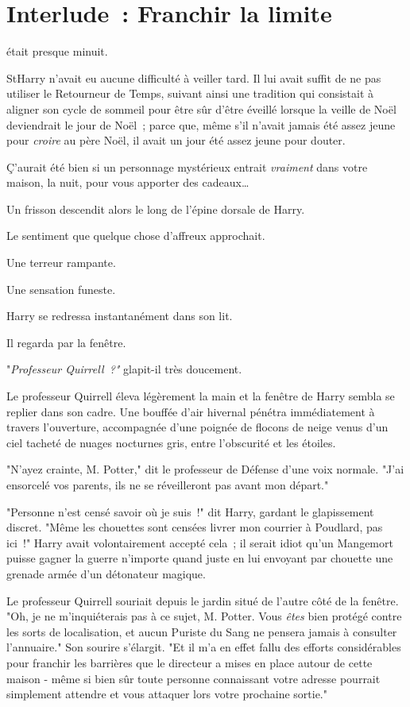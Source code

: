 \chapter{Interlude~: Franchir la limite}

 était presque minuit.

\hplettrineextrapara
StHarry n'avait eu aucune difficulté à veiller tard. Il lui avait suffit de ne pas utiliser le Retourneur de Temps, suivant ainsi une tradition qui consistait à aligner son cycle de sommeil pour être sûr d'être éveillé lorsque la veille de Noël deviendrait le jour de Noël~; parce que, même s'il n'avait jamais été assez jeune pour \emph{croire} au père Noël, il avait un jour été assez jeune pour douter.

Ç'aurait été bien si un personnage mystérieux entrait \emph{vraiment} dans votre maison, la nuit, pour vous apporter des cadeaux…

Un frisson descendit alors le long de l'épine dorsale de Harry.

Le sentiment que quelque chose d'affreux approchait.

Une terreur rampante.

Une sensation funeste.

Harry se redressa instantanément dans son lit.

Il regarda par la fenêtre.

"\emph{Professeur Quirrell~?"} glapit-il très doucement.

Le professeur Quirrell éleva légèrement la main et la fenêtre de Harry sembla se replier dans son cadre. Une bouffée d'air hivernal pénétra immédiatement à travers l'ouverture, accompagnée d'une poignée de flocons de neige venus d'un ciel tacheté de nuages nocturnes gris, entre l'obscurité et les étoiles.

"N'ayez crainte, M. Potter," dit le professeur de Défense d'une voix normale. "J'ai ensorcelé vos parents, ils ne se réveilleront pas avant mon départ."

"Personne n'est censé savoir où je suis~!" dit Harry, gardant le glapissement discret. "Même les chouettes sont censées livrer mon courrier à Poudlard, pas ici~!" Harry avait volontairement accepté cela~; il serait idiot qu'un Mangemort puisse gagner la guerre n'importe quand juste en lui envoyant par chouette une grenade armée d'un détonateur magique.

Le professeur Quirrell souriait depuis le jardin situé de l'autre côté de la fenêtre. "Oh, je ne m'inquiéterais pas à ce sujet, M. Potter. Vous \emph{êtes} bien protégé contre les sorts de localisation, et aucun Puriste du Sang ne pensera jamais à consulter l'annuaire." Son sourire s'élargit. "Et il m'a en effet fallu des efforts considérables pour franchir les barrières que le directeur a mises en place autour de cette maison - même si bien sûr toute personne connaissant votre adresse pourrait simplement attendre et vous attaquer lors votre prochaine sortie."

